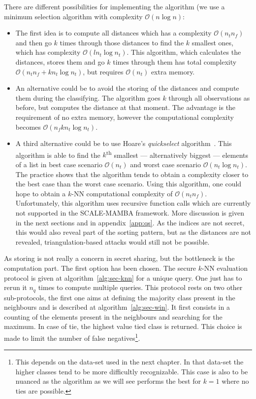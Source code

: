 There are different possibilities for implementing the algorithm (we use a minimum selection algorithm with complexity $\mathcal{O}(n\log n)$:
\begin{itemize}
    \item The first idea is to compute all distances which has a complexity $\mathcal{O}\left(n_tn_f\right)$ and then go $k$ times through those distances to find the $k$ smallest ones, which has complexity $\mathcal{O}\left(ln_t\log n_t\right)$. This algorithm, which calculates the distances, stores them and go $k$ times through them has total complexity $\mathcal{O}\left(n_tn_f+kn_t\log n_t \right)$, but requires $\mathcal{O}\left(n_t\right)$ extra memory.
    \item An alternative could be to avoid the storing of the distances and compute them during the classifying. The algorithm goes $k$ through all observations as before, but computes the distance at that moment. The advantage is the requirement of no extra memory, however the computational complexity becomes $\mathcal{O}\left(n_fkn_t \log n_t\right)$.
    \item A third alternative could be to use Hoare's \emph{quickselect} algorithm~\cite{Hoare:1961:AF:366622.366647}. This algorithm is able to find the $k$\textsuperscript{th} smallest --- alternatively biggest --- elements of a list in best case scenario $\mathcal{O}\left(n_t\right)$ and worst case scenario $\mathcal{O}\left(n_t \log n_t\right)$. The practice shows that the algorithm tends to obtain a complexity closer to the best case than the worst case scenario. Using this algorithm, one could hope to obtain a $k$-NN computational complexity of $\mathcal{O}\left(n_tn_f\right)$. Unfortunately, this algorithm uses recursive function calls which are currently not supported in the SCALE-MAMBA framework. More discussion is given in the next sections and in appendix~\ref{app:qs}. As the indices are not secret, this would also reveal part of the sorting pattern, but as the distances are not revealed, triangulation-based attacks would still not be possible.
\end{itemize}
As storing is not really a concern in secret sharing, but the bottleneck is the computation part. The first option has been chosen. The secure $k$-NN evaluation protocol is given at algorithm~\ref{alg:sec-knn} for a unique query. One just has to rerun it $n_q$ times to compute multiple queries. This protocol rests on two other sub-protocols, the first one aims at defining the majority class present in the neighbours and is described at algorithm~\ref{alg:sec-win}. It first consists in a counting of the elements present in the neighbours and searching for the maximum. In case of tie, the highest value tied class is returned. This choice is made to limit the number of false negatives\footnote{This depends on the data-set used in the next chapter. In that data-set the higher classes tend to be more difficultly recognizable. This case is also to be nuanced as the algorithm as we will see performs the best for $k=1$ where no ties are possible.}.

